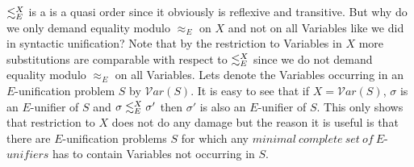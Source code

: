 $\lesssim^X_E$ is a is a quasi order since it obviously is reflexive and transitive. But why do we only demand equality modulo $\approx_E$ on $X$ and not on all Variables like we did in syntactic unification? 
Note that by the restriction to Variables in $X$ more substitutions are comparable with respect to $\lesssim^X_E$ since we do not demand equality modulo $\approx_E$ on all Variables. Lets denote the Variables occurring in an $E$-unification problem $S$ by $\mathcal{V}ar(S)$. It is easy to see that if $X=\mathcal{V}ar(S)$, $\sigma$ is an $E$-unifier of $S$ and $\sigma\lesssim^X_E\sigma'$ then $\sigma'$ is also an $E$-unifier of $S$. This only shows that restriction to $X$ does not do any damage but the reason it is useful is that there are $E$-unification problems $S$ for which any $minimal\ complete\ set\ of\ E$-$unifiers$ has to contain Variables not occurring in $S$. 

